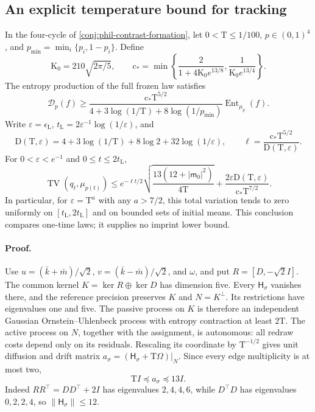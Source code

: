 \subsection*{An explicit temperature bound for tracking}

In the four-cycle of \cref{conj:phil-contrast-formation}, let
\(0<\mathrm T\le1/100\), \(p\in(0,1)^4\), and
\(p_{\min}=\min_i\{p_i,1-p_i\}\). Define
\[
 \mathrm K_0=210\sqrt{2\pi/5},\qquad
 \mathrm c_* =\min\left\{
 \frac2{1+4\mathrm K_0e^{13/8}},\frac1{\mathrm K_0e^{13/4}}\right\}.
\]
The entropy production of the full frozen law satisfies
\[
 \mathscr D_p(f)\ge
 \frac{\mathrm c_*\mathrm T^{5/2}}
 {4+3\log(1/\mathrm T)+8\log(1/p_{\min})}
 \operatorname{Ent}_{\mu_p}(f).
\]
Write \(\varepsilon=\epsilon_{\mathrm L}\),
\(t_{\mathrm L}=2\varepsilon^{-1}\log(1/\varepsilon)\), and
\[
 \mathrm D(\mathrm T,\varepsilon)
 =4+3\log(1/\mathrm T)+8\log2+32\log(1/\varepsilon),\qquad
 \ell=\frac{\mathrm c_*\mathrm T^{5/2}}
                {\mathrm D(\mathrm T,\varepsilon)}.
\]
For \(0<\varepsilon<e^{-1}\) and \(0\le t\le2t_{\mathrm L}\),
\begin{equation}
 \operatorname{TV}(q_t,\mu_{p(t)})
 \le e^{-\ell t/2}
       \sqrt{\frac{13(12+|\mathsf m_0|^2)}{4\mathrm T}}
    +\frac{2\varepsilon\mathrm D(\mathrm T,\varepsilon)}
                 {\mathrm c_*\mathrm T^{7/2}}.
\label{eq:phil-temperature-tracking}
\end{equation}
In particular, for \(\varepsilon=\mathrm T^a\) with any \(a>7/2\),
this total variation tends to zero uniformly on
\([t_{\mathrm L},2t_{\mathrm L}]\) and on bounded sets of initial means.
This conclusion compares one-time laws; it supplies no imprint lower bound.

\paragraph{Proof.}
Use \(u=(\bar k+\bar m)/\sqrt2\),
\(v=(\bar k-\bar m)/\sqrt2\), and \(\omega\), and put
\(R=[D,-\sqrt2I]\). The common kernel
\(K=\ker R\oplus\ker D\) has dimension five. Every
\(\mathsf H_\sigma\) vanishes there, and the reference precision preserves
\(K\) and \(N=K^\perp\). Its restrictions have eigenvalues one and five.
The passive process on \(K\) is therefore an independent Gaussian
Ornstein--Uhlenbeck process with entropy contraction at least \(2\mathrm T\).
The active process on \(N\), together with the assignment, is autonomous:
all redraw costs depend only on its residuals. Rescaling its coordinate by
\(\mathrm T^{-1/2}\) gives unit diffusion and drift matrix
\(a_\sigma=(\mathsf H_\sigma+\mathrm T\mathsf\Omega)|_N\).
Since every edge multiplicity is at most two,
\[
 \mathrm TI\preceq a_\sigma\preceq13I.
\]
Indeed \(RR^\top=DD^\top+2I\) has eigenvalues \(2,4,4,6\),
while \(D^\top D\) has eigenvalues \(0,2,2,4\), so
\(\|\mathsf H_\sigma\|\le12\).

